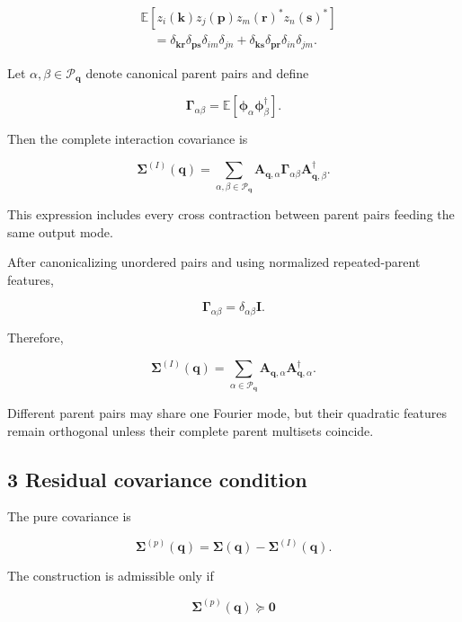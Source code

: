 \documentclass[
  11pt,
  a4paper,
]{article}
\begin{document}
\[
\begin{aligned}
&
\mathbb E\!\left[
z_i(\boldsymbol k)z_j(\boldsymbol p)
z_m(\boldsymbol r)^*z_n(\boldsymbol s)^*
\right]
\\
&\quad=
\delta_{\boldsymbol k\boldsymbol r}
\delta_{\boldsymbol p\boldsymbol s}
\delta_{im}\delta_{jn}
+
\delta_{\boldsymbol k\boldsymbol s}
\delta_{\boldsymbol p\boldsymbol r}
\delta_{in}\delta_{jm}.
\end{aligned}
\]

Let \(\alpha,\beta\in\mathcal P_{\boldsymbol q}\) denote canonical
parent pairs and define

\[
\boldsymbol\Gamma_{\alpha\beta}
=
\mathbb E[
\boldsymbol\phi_\alpha
\boldsymbol\phi_\beta^\dagger
].
\]

Then the complete interaction covariance is

\[
\boldsymbol\Sigma^{(I)}(\boldsymbol q)
=
\sum_{\alpha,\beta\in\mathcal P_{\boldsymbol q}}
\boldsymbol A_{\boldsymbol q,\alpha}
\boldsymbol\Gamma_{\alpha\beta}
\boldsymbol A_{\boldsymbol q,\beta}^\dagger.
\]

This expression includes every cross contraction between parent pairs
feeding the same output mode.

After canonicalizing unordered pairs and using normalized
repeated-parent features,

\[
\boldsymbol\Gamma_{\alpha\beta}
=
\delta_{\alpha\beta}\boldsymbol I.
\]

Therefore,

\[
\boxed{
\boldsymbol\Sigma^{(I)}(\boldsymbol q)
=
\sum_{\alpha\in\mathcal P_{\boldsymbol q}}
\boldsymbol A_{\boldsymbol q,\alpha}
\boldsymbol A_{\boldsymbol q,\alpha}^\dagger
}.
\]

Different parent pairs may share one Fourier mode, but their quadratic
features remain orthogonal unless their complete parent multisets
coincide.

\subsection{3 Residual covariance
condition}\label{residual-covariance-condition}

The pure covariance is

\[
\boxed{
\boldsymbol\Sigma^{(p)}(\boldsymbol q)
=
\boldsymbol\Sigma(\boldsymbol q)
-
\boldsymbol\Sigma^{(I)}(\boldsymbol q)
}.
\]

The construction is admissible only if

\[
\boxed{
\boldsymbol\Sigma^{(p)}(\boldsymbol q)
\succeq\boldsymbol0
}
\]
\end{document}
